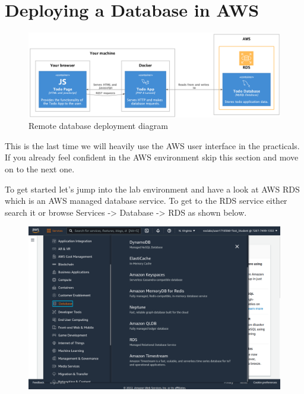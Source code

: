 \documentclass{csse4400}
\begin{document}
\section{Deploying a Database in AWS}



\begin{figure}[ht]
\includegraphics[width=\textwidth]{diagrams/remotedb}
\caption{Remote database deployment diagram}
\end{figure}

This is the last time we will heavily use the AWS user interface in the practicals. If you already feel confident in the AWS environment skip this section and move on to the next one.


To get started let's jump into the lab environment and have a look at AWS RDS which is an AWS managed database service. To get to the RDS service either search it or browse Services -> Database -> RDS as shown below.

\begin{figure}[H]
\includegraphics[width=\textwidth]{images/aws_1}
\end{figure}
\end{document}
